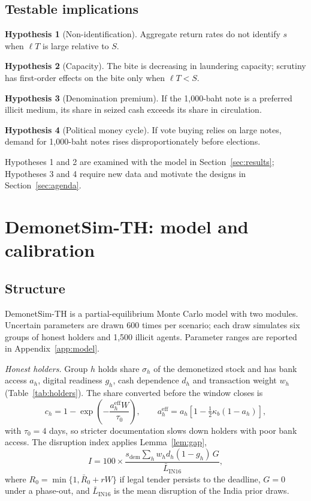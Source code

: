\documentclass[11pt]{article}
\theoremstyle{definition}
\newtheorem{hypothesis}{Hypothesis}
\theoremstyle{remark}
\begin{document}
\subsection{Testable implications}
\begin{hypothesis}[Non-identification] Aggregate return rates do not identify $s$ when $\ell T$ is large relative to
$S$.\end{hypothesis}
\begin{hypothesis}[Capacity] The bite is decreasing in laundering capacity; scrutiny has first-order effects on the bite
only when $\ell T<S$.\end{hypothesis}
\begin{hypothesis}[Denomination premium] If the 1,000-baht note is a preferred illicit medium, its share in seized cash
exceeds its share in circulation.\end{hypothesis}
\begin{hypothesis}[Political money cycle] If vote buying relies on large notes, demand for 1,000-baht notes rises
disproportionately before elections.\end{hypothesis}

\noindent Hypotheses 1 and 2 are examined with the model in Section~\ref{sec:results}; Hypotheses 3 and 4 require new
data and motivate the designs in Section~\ref{sec:agenda}.

\section{DemonetSim-TH: model and calibration}\label{sec:model}

\subsection{Structure}
DemonetSim-TH is a partial-equilibrium Monte Carlo model with two modules. Uncertain parameters are drawn 600 times per
scenario; each draw simulates six groups of honest holders and 1,500 illicit agents. Parameter ranges are reported in
Appendix~\ref{app:model}.

\textit{Honest holders.} Group $h$ holds share $\sigma_h$ of the demonetized stock and has bank access $a_h$, digital
readiness $g_h$, cash dependence $d_h$ and transaction weight $w_h$ (Table~\ref{tab:holders}). The share converted before
the window closes is
\begin{equation}\label{eq:conv}
c_h=1-\exp\!\left(-\frac{a_h^{\mathrm{eff}}W}{\tau_0}\right),\qquad a_h^{\mathrm{eff}}=a_h\left[1-\tfrac12\kappa_b(1-a_h)\right],
\end{equation}
with $\tau_0=4$ days, so stricter documentation slows down holders with poor bank access. The disruption index applies
Lemma~\ref{lem:gap},
\begin{equation}\label{eq:index}
I=100\times\frac{s_{\mathrm{dem}}\sum_h w_h d_h(1-g_h)\,G}{\bar L_{\mathrm{IN16}}},
\end{equation}
where $R_0=\min\{1,\bar R_0+rW\}$ if legal tender persists to the deadline, $G=0$ under a phase-out, and
$\bar L_{\mathrm{IN16}}$ is the mean disruption of the India prior draws.
\end{document}
